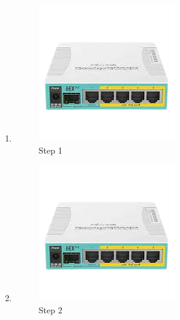 \begin{enumerate}
	\item 
	
	\begin{figure}[H]
		\centering
		\includegraphics[width=0.7\linewidth]{P1/img/contoh.png}
		\caption{Step 1}
		\label{fig:gambar1}
	\end{figure}

	\item 	
	
	\begin{figure}[H]
		\centering
		\includegraphics[width=0.7\linewidth]{P1/img/contoh.png}
		\caption{Step 2}
		\label{fig:gambar1}
	\end{figure}

\end{enumerate}


